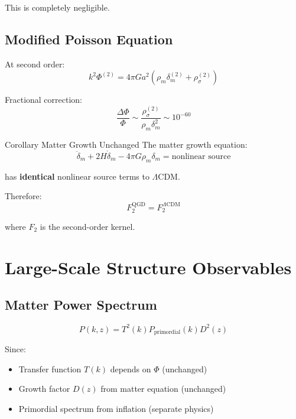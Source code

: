 \documentclass[11pt,a4paper]{article}
\theoremstyle{definition}
\theoremstyle{remark}
\begin{document}
	This is completely negligible.
	
	\subsection{Modified Poisson Equation}
	
	At second order:
	\begin{equation}
		k^2\Phi^{(2)} = 4\pi Ga^2(\rho_m\delta_m^{(2)} + \rho_\sigma^{(2)})
	\end{equation}
	
	Fractional correction:
	\begin{equation}
		\frac{\Delta\Phi}{\Phi} \sim \frac{\rho_\sigma^{(2)}}{\rho_m\delta_m^2} \sim 10^{-60}
	\end{equation}
	
	Corollary Matter Growth Unchanged
		The matter growth equation:
		\begin{equation}
			\ddot{\delta}_m + 2H\dot{\delta}_m - 4\pi G\rho_m\delta_m = \text{nonlinear source}
		\end{equation}
		
		has \textbf{identical} nonlinear source terms to $\Lambda$CDM.
		
		Therefore:
		\begin{equation}
			\boxed{F_2^{\text{QGD}} = F_2^{\Lambda\text{CDM}}}
		\end{equation}
		
		where $F_2$ is the second-order kernel.
	
	\section{Large-Scale Structure Observables}
	
	\subsection{Matter Power Spectrum}
	
	\begin{equation}
		P(k, z) = T^2(k)P_{\text{primordial}}(k)D^2(z)
	\end{equation}
	
	Since:
	\begin{itemize}
		\item Transfer function $T(k)$ depends on $\Phi$ (unchanged)
		\item Growth factor $D(z)$ from matter equation (unchanged)
		\item Primordial spectrum from inflation (separate physics)
	\end{itemize}
	
\end{document}
